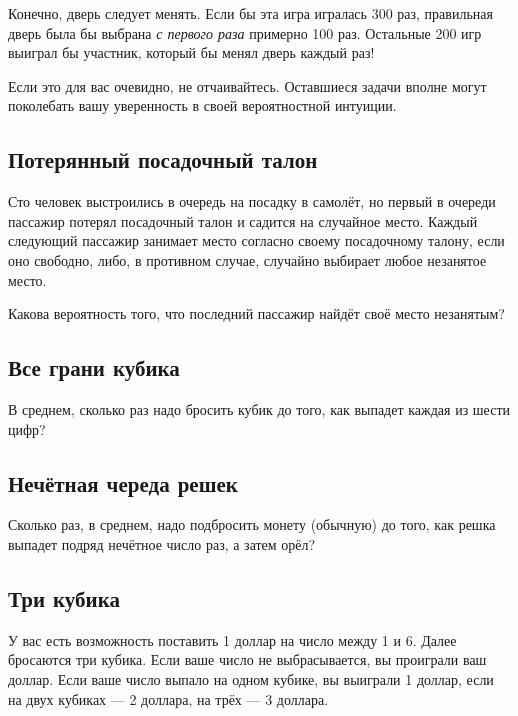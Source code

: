 Конечно, дверь следует менять.
Если бы эта игра игралась 300 раз, правильная дверь была бы выбрана \emph{с первого раза} примерно 100 раз.
Остальные 200 игр выиграл бы участник, который бы менял дверь каждый раз!

\medskip

Если это для вас очевидно, не отчаивайтесь.
Оставшиеся задачи вполне могут поколебать вашу уверенность в своей вероятностной интуиции.

\subsection*{Потерянный посадочный талон}%

Сто человек выстроились в очередь на посадку в самолёт, но первый в очереди пассажир потерял посадочный талон и садится на случайное место.
Каждый следующий пассажир занимает место согласно своему посадочному талону, если оно свободно, либо, в противном случае, случайно выбирает любое незанятое место.

\medskip

Какова вероятность того, что последний пассажир найдёт своё место незанятым?

\subsection*{Все грани кубика}%

В среднем, сколько раз надо бросить кубик до того, как выпадет каждая из шести цифр?

\subsection*{Нечётная череда решек}%

Сколько раз, в среднем, надо подбросить монету (обычную) до того, как решка выпадет подряд нечётное число раз, а затем орёл? 

\subsection*{Три кубика}%

У вас есть возможность поставить 1 доллар на число между 1 и 6.
Далее бросаются три кубика.
Если ваше число не выбрасывается, вы проиграли ваш доллар.
Если ваше число выпало на одном кубике, вы выиграли 1 доллар, если на двух кубиках --- 2 доллара, на трёх --- 3 доллара.

